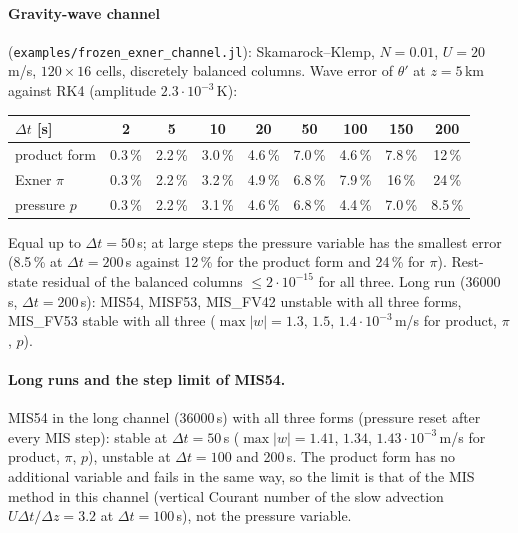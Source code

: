 \documentclass[11pt,a4paper]{article}
\newcommand{\code}[1]{\texttt{#1}}
\newcommand{\dt}{\Delta t}
\begin{document}
\paragraph{Gravity-wave channel} (\code{examples/frozen\_exner\_channel.jl}): Skamarock--Klemp, $N=0.01$,
$U=20$\,m/s, $120\times16$ cells, discretely balanced columns. Wave error of $\theta'$ at $z=5$\,km
against RK4 (amplitude $2.3\cdot10^{-3}$\,K):
\begin{center}\begin{tabular}{lcccccccc}\toprule
$\dt$ [s] & 2 & 5 & 10 & 20 & 50 & 100 & 150 & 200\\\midrule
product form & 0.3\,\% & 2.2\,\% & 3.0\,\% & 4.6\,\% & 7.0\,\% & 4.6\,\% & 7.8\,\% & 12\,\%\\
Exner $\pi$ & 0.3\,\% & 2.2\,\% & 3.2\,\% & 4.9\,\% & 6.8\,\% & 7.9\,\% & 16\,\% & 24\,\%\\
pressure $p$ & 0.3\,\% & 2.2\,\% & 3.1\,\% & 4.6\,\% & 6.8\,\% & 4.4\,\% & 7.0\,\% & 8.5\,\%\\\bottomrule
\end{tabular}\end{center}
Equal up to $\dt=50$\,s; at large steps the pressure variable has the smallest error (8.5\,\% at
$\dt=200$\,s against 12\,\% for the product form and 24\,\% for $\pi$). Rest-state residual of the
balanced columns $\le2\cdot10^{-15}$ for all three. Long run (36000\,s, $\dt=200$\,s): MIS54, MISF53,
MIS\_FV42 unstable with all three forms, MIS\_FV53 stable with all three ($\max|w|=1.3$, $1.5$,
$1.4\cdot10^{-3}$\,m/s for product, $\pi$, $p$).

\paragraph{Long runs and the step limit of MIS54.} MIS54 in the long channel (36000\,s) with all three
forms (pressure reset after every MIS step): stable at $\dt=50$\,s ($\max|w|=1.41$, $1.34$,
$1.43\cdot10^{-3}$\,m/s for product, $\pi$, $p$), unstable at $\dt=100$ and 200\,s. The product form has
no additional variable and fails in the same way, so the limit is that of the MIS method in this channel
(vertical Courant number of the slow advection $U\dt/\Delta z=3.2$ at $\dt=100$\,s), not the pressure
variable.
\end{document}
